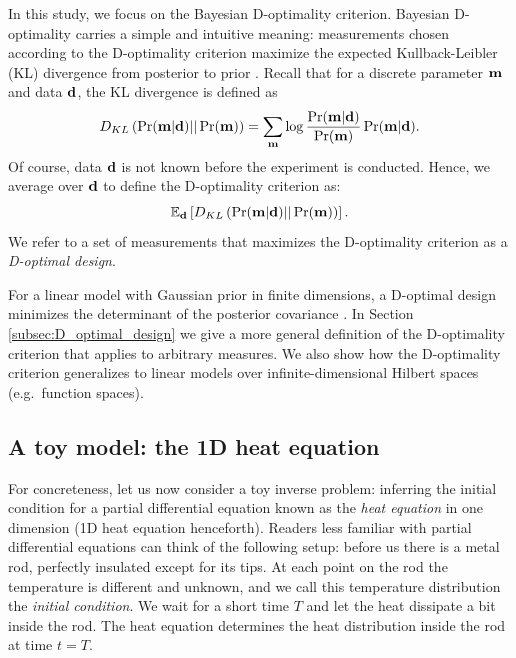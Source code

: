 In this study, we focus on the Bayesian D-optimality
criterion. Bayesian D-optimality carries a simple and intuitive
meaning: measurements chosen according to the D-optimality criterion
maximize the expected Kullback-Leibler (KL) divergence from posterior
to prior \citet{chaloner1995, AlexanderianGloorGhattas14,
  CoverThomas91}.
Recall that for a discrete parameter $\mathbf{m}$ and data $\mathbf{d}$, the KL
divergence is defined as
\begin{equation}\label{eq:basic_KL}
  D_{KL}\left (\Pr(\param|\data)||\Pr(\param)\right ) =  \sum_{\param} \log
  \frac{\Pr(\param|\data)}{\Pr(\param)} \Pr(\param|\data). 
\end{equation}
Of course, data $\mathbf{d}$ is not known before the experiment is
conducted. Hence, we average over $\mathbf{d}$ to define the D-optimality
criterion as:
\begin{equation*}
  \mathbb{E}_{\data}\left [ D_{KL}\left (\Pr(\param|\data)||\Pr(\param)\right ) \right ].
\end{equation*}
We refer to a set of measurements that maximizes the D-optimality
criterion as a \emph{D-optimal design}.

For a linear model with Gaussian prior in finite dimensions, a
D-optimal design minimizes the determinant of the posterior covariance
\citet{chaloner1995}. In Section \ref{subsec:D_optimal_design} we give
a more general definition of the D-optimality criterion that applies
to arbitrary measures. We also show how the D-optimality criterion
generalizes to linear models over infinite-dimensional Hilbert spaces
(e.g.~function spaces).

\subsection{A toy model: the 1D heat equation}\label{subsec:toy}
For concreteness, let us now consider a toy inverse problem: inferring
the initial condition for a partial differential equation known as the
\emph{heat equation} in one dimension (1D heat equation
henceforth). Readers less familiar with partial differential equations
can think of the following setup: before us there is a metal rod,
perfectly insulated except for its tips. At each point on the rod the
temperature is different and unknown, and we call this temperature
distribution the \emph{initial condition}. We wait for a short time
$T$ and let the heat dissipate a bit inside the rod. The heat equation
determines the heat distribution inside the rod at time $t=T$.

